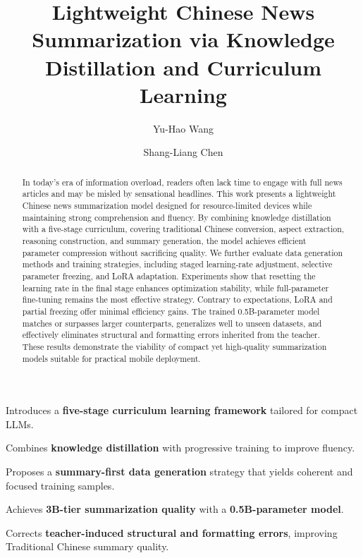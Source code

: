 \documentclass[preprint,12pt]{elsarticle}
\begin{document}
\begin{frontmatter}

\title{Lightweight Chinese News Summarization via Knowledge Distillation and Curriculum Learning}

\author[1]{Yu-Hao Wang}

\author[1]{Shang-Liang Chen}



\begin{abstract}
In today’s era of information overload, readers often lack time to engage with full news articles and may be misled by sensational headlines. This work presents a lightweight Chinese news summarization model designed for resource-limited devices while maintaining strong comprehension and fluency. By combining knowledge distillation with a five-stage curriculum, covering traditional Chinese conversion, aspect extraction, reasoning construction, and summary generation, the model achieves efficient parameter compression without sacrificing quality. We further evaluate data generation methods and training strategies, including staged learning-rate adjustment, selective parameter freezing, and LoRA adaptation. Experiments show that resetting the learning rate in the final stage enhances optimization stability, while full-parameter fine-tuning remains the most effective strategy. Contrary to expectations, LoRA and partial freezing offer minimal efficiency gains. The trained 0.5B-parameter model matches or surpasses larger counterparts, generalizes well to unseen datasets, and effectively eliminates structural and formatting errors inherited from the teacher. These results demonstrate the viability of compact yet high-quality summarization models suitable for practical mobile deployment.
\end{abstract}

\begin{highlights}
\item Introduces a \textbf{five-stage curriculum learning framework} tailored for compact LLMs.
\item Combines \textbf{knowledge distillation} with progressive training to improve fluency.
\item Proposes a \textbf{summary-first data generation} strategy that yields coherent and focused training samples.
\item Achieves \textbf{3B-tier summarization quality} with a \textbf{0.5B-parameter model}.
\item Corrects \textbf{teacher-induced structural and formatting errors}, improving Traditional Chinese summary quality.
\end{highlights}


\end{frontmatter}
\end{document}
